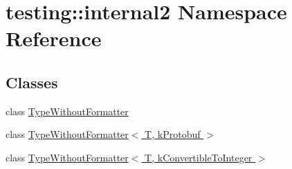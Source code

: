 \hypertarget{namespacetesting_1_1internal2}{\section{testing\-:\-:internal2 \-Namespace \-Reference}
\label{da/df7/namespacetesting_1_1internal2}
}
\subsection*{\-Classes}
\begin{DoxyCompactItemize}
\item 
class \hyperlink{classtesting_1_1internal2_1_1TypeWithoutFormatter}{\-Type\-Without\-Formatter}
\item 
class \hyperlink{classtesting_1_1internal2_1_1TypeWithoutFormatter_3_01T_00_01kProtobuf_01_4}{\-Type\-Without\-Formatter$<$ T, k\-Protobuf $>$}
\item 
class \hyperlink{classtesting_1_1internal2_1_1TypeWithoutFormatter_3_01T_00_01kConvertibleToInteger_01_4}{\-Type\-Without\-Formatter$<$ T, k\-Convertible\-To\-Integer $>$}
\end{DoxyCompactItemize}
